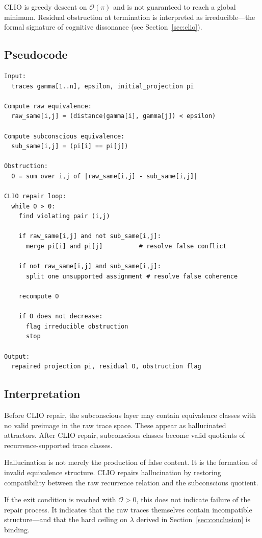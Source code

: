 \documentclass[12pt,a4paper]{article}
\begin{document}
CLIO is greedy descent on $\mathcal{O}(\pi)$ and is not guaranteed to reach a global minimum. Residual obstruction at termination is interpreted as irreducible---the formal signature of cognitive dissonance (see Section~\ref{sec:clio}).

\subsection{Pseudocode}

\begin{verbatim}
Input:
  traces gamma[1..n], epsilon, initial_projection pi

Compute raw equivalence:
  raw_same[i,j] = (distance(gamma[i], gamma[j]) < epsilon)

Compute subconscious equivalence:
  sub_same[i,j] = (pi[i] == pi[j])

Obstruction:
  O = sum over i,j of |raw_same[i,j] - sub_same[i,j]|

CLIO repair loop:
  while O > 0:
    find violating pair (i,j)

    if raw_same[i,j] and not sub_same[i,j]:
      merge pi[i] and pi[j]          # resolve false conflict

    if not raw_same[i,j] and sub_same[i,j]:
      split one unsupported assignment # resolve false coherence

    recompute O

    if O does not decrease:
      flag irreducible obstruction
      stop

Output:
  repaired projection pi, residual O, obstruction flag
\end{verbatim}

\subsection{Interpretation}

Before CLIO repair, the subconscious layer may contain equivalence classes with no valid preimage in the raw trace space. These appear as hallucinated attractors. After CLIO repair, subconscious classes become valid quotients of recurrence-supported trace classes.

Hallucination is not merely the production of false content. It is the formation of invalid equivalence structure. CLIO repairs hallucination by restoring compatibility between the raw recurrence relation and the subconscious quotient.

If the exit condition is reached with $\mathcal{O} > 0$, this does not indicate failure of the repair process. It indicates that the raw traces themselves contain incompatible structure---and that the hard ceiling on $\lambda$ derived in Section~\ref{sec:conclusion} is binding.
\end{document}
